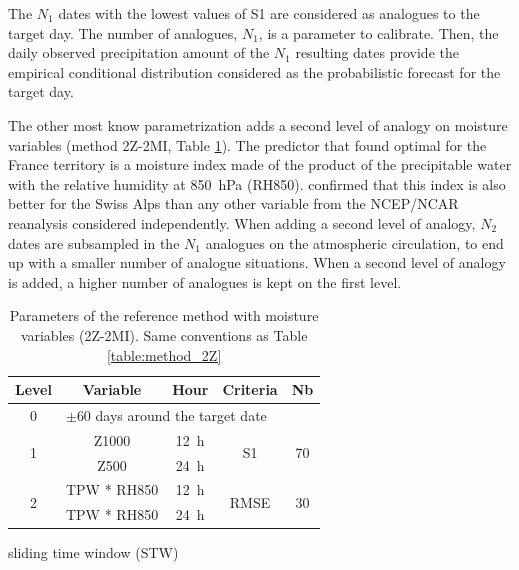\documentclass[hess]{copernicus}
\begin{document}
The $N_{1}$ dates with the lowest values of S1 are considered as analogues to the target day. The number of analogues, $N_{1}$, is a parameter to calibrate. Then, the daily observed precipitation amount of the $N_{1}$ resulting dates provide the empirical conditional distribution considered as the probabilistic forecast for the target day.

The other most know parametrization adds a second level of analogy on moisture variables (method 2Z-2MI, Table \ref{table:method_2Z-2MI}). The predictor that \citet{Bontron2004} found optimal for the France territory is a moisture index made of the product of the precipitable water with the relative humidity at 850~hPa (RH850). \cite{Horton2012a} confirmed that this index is also better for the Swiss Alps than any other variable from the NCEP/NCAR reanalysis considered independently. When adding a second level of analogy, $N_{2}$ dates are subsampled in the $N_{1}$ analogues on the atmospheric circulation, to end up with a smaller number of analogue situations. When a second level of analogy is added, a higher number of analogues is kept on the first level.

\begin{table}[htb]
	\caption{Parameters of the reference method with moisture variables (2Z-2MI). Same conventions as Table \ref{table:method_2Z}}
	\footnotesize
	\begin{center}
		\begin{tabular}{ccccc}
			\hline 
			Level & Variable & Hour & Criteria & Nb \\ 
			\hline 
			0 & \multicolumn{4}{l}{$\pm 60$ days around the target date} \\
			\hline 
			\multirow{2}{*}{1} & Z1000 & 12~h & \multirow{2}{*}{S1} & \multirow{2}{*}{70} \\
			& Z500 & 24~h & & \\ 
			\hline
			\multirow{2}{*}{2} & TPW * RH850 & 12~h & \multirow{2}{*}{RMSE} & \multirow{2}{*}{30} \\
			& TPW * RH850 & 24~h & & \\ 
			\hline 
		\end{tabular} 
	\end{center}
	\label{table:method_2Z-2MI}
\end{table}








sliding time window (STW)
\end{document}
